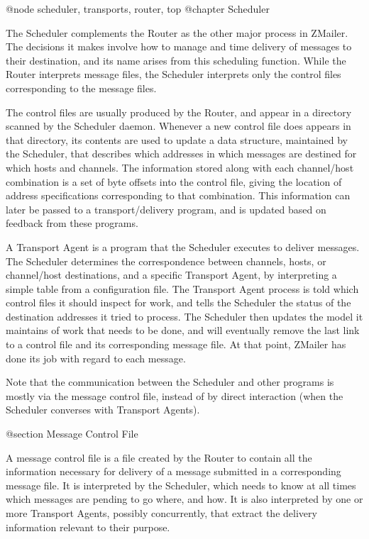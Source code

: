 {{@node scheduler, transports, router, top
@chapter Scheduler

The Scheduler complements the Router as the other major process in ZMailer.
The decisions it makes involve how to manage and time delivery of messages
to their destination, and its name arises from this scheduling function.
While the Router interprets message files, the Scheduler interprets only
the control files corresponding to the message files.

The control files are usually produced by the Router, and appear
in a directory scanned by the Scheduler daemon.
Whenever a new control file does appears in that directory, its
contents are used to update a data structure, maintained by
the Scheduler, that describes which addresses in which messages
are destined for which hosts and channels.
The information stored along with each channel/host combination
is a set of byte offsets into the control file, giving the location
of address specifications corresponding to that combination.
This information can later be passed to a transport/delivery program,
and is updated based on feedback from these programs.


A Transport Agent is a program that the Scheduler executes to deliver
messages.
The Scheduler determines the correspondence between channels, hosts,
or channel/host destinations, and a specific Transport Agent, by
interpreting a simple table from a configuration file.
The Transport Agent process is told which control files it should
inspect for work, and tells the Scheduler the status of the destination
addresses it tried to process.
The Scheduler then updates the model it maintains of work that needs
to be done, and will eventually remove the last link to a control file
and its corresponding message file.
At that point, ZMailer has done its job with regard to each message.

Note that the communication between the Scheduler and other programs
is mostly via the message control file, instead of by direct interaction
(when the Scheduler converses with Transport Agents).

@section Message Control File

A message control file is a file created by the Router to contain all
the information necessary for delivery of a message submitted in
a corresponding message file.
It is interpreted by the Scheduler, which needs to know at all times
which messages are pending to go where, and how.
It is also interpreted by one or more Transport Agents, possibly
concurrently, that extract the delivery information relevant to
their purpose.

}}

